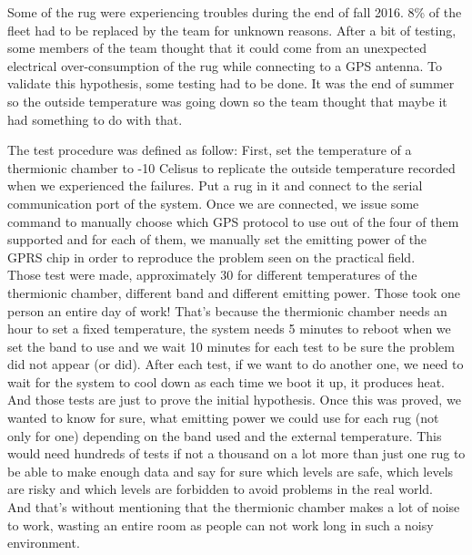 \documentclass[12pt]{article}
\theoremstyle{definition}
\theoremstyle{definition}
\theoremstyle{remark}
\begin{document}
Some of the \gls{rug} were experiencing troubles during the end of fall 2016. 8\% of the fleet had to be replaced by the team for unknown reasons. After a bit of testing, some members of the team thought that it could come from an unexpected electrical over-consumption of the \gls{rug} while connecting to a GPS antenna. To validate this hypothesis, some testing had to be done. It was the end of summer so the outside temperature was going down so the team thought that maybe it had something to do with that.

The test procedure was defined as follow: First, set the temperature of a thermionic chamber to -10 Celisus to replicate the outside temperature recorded when we experienced the failures. Put a \gls{rug} in it and connect to the serial communication port of the system. Once we are connected, we issue some command to manually choose which GPS protocol to use out of the four of them supported and for each of them, we manually set the emitting power of the GPRS chip in order to reproduce the problem seen on the practical field.\\

Those test were made, approximately 30 for different temperatures of the thermionic chamber, different band and different emitting power. Those took one person an entire day of work! That's because the thermionic chamber needs an hour to set a fixed temperature, the system needs 5 minutes to reboot when we set the band to use and we wait 10 minutes for each test to be sure the problem did not appear (or did). After each test, if we want to do another one, we need to wait for the system to cool down as each time we boot it up, it produces heat.\\

And those tests are just to prove the initial hypothesis. Once this was proved, we wanted to know for sure, what emitting power we could use for each \gls{rug} (not only for one) depending on the band used and the external temperature. This would need hundreds of tests if not a thousand on a lot more than just one \gls{rug} to be able to make enough data and say for sure which levels are safe, which levels are risky and which levels are forbidden to avoid problems in the real world.\\

And that's without mentioning that the thermionic chamber makes a lot of noise to work, wasting an entire room as people can not work long in such a noisy environment.\\
\end{document}
